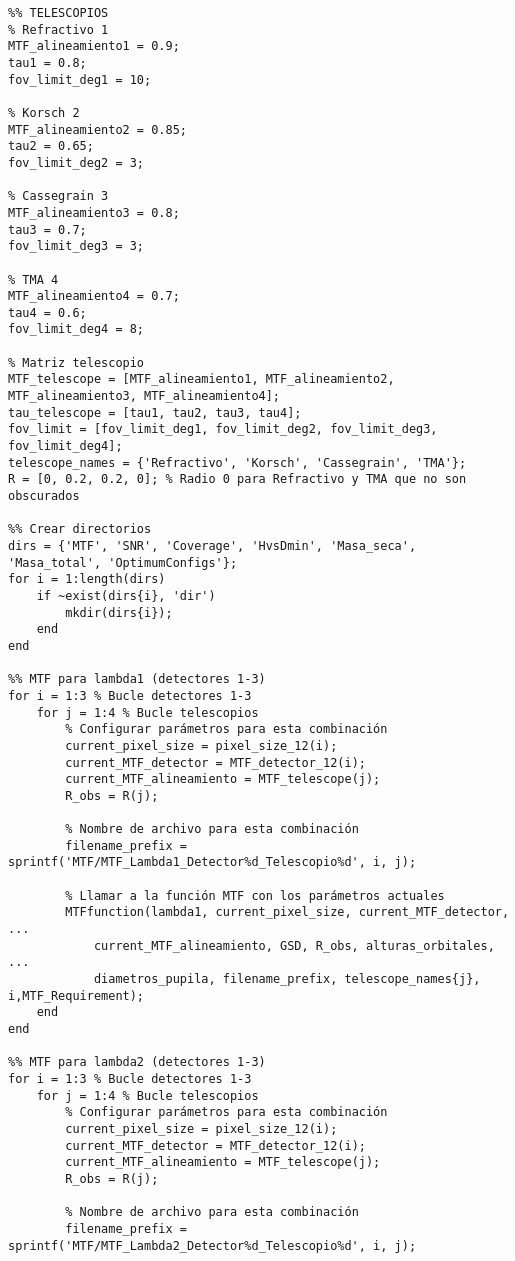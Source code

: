 \begin{verbatim}
%% TELESCOPIOS
% Refractivo 1
MTF_alineamiento1 = 0.9;
tau1 = 0.8;
fov_limit_deg1 = 10;

% Korsch 2
MTF_alineamiento2 = 0.85;
tau2 = 0.65;
fov_limit_deg2 = 3;

% Cassegrain 3
MTF_alineamiento3 = 0.8;
tau3 = 0.7;
fov_limit_deg3 = 3;

% TMA 4
MTF_alineamiento4 = 0.7;
tau4 = 0.6;
fov_limit_deg4 = 8;

% Matriz telescopio
MTF_telescope = [MTF_alineamiento1, MTF_alineamiento2, MTF_alineamiento3, MTF_alineamiento4];
tau_telescope = [tau1, tau2, tau3, tau4];
fov_limit = [fov_limit_deg1, fov_limit_deg2, fov_limit_deg3, fov_limit_deg4];
telescope_names = {'Refractivo', 'Korsch', 'Cassegrain', 'TMA'};
R = [0, 0.2, 0.2, 0]; % Radio 0 para Refractivo y TMA que no son obscurados

%% Crear directorios
dirs = {'MTF', 'SNR', 'Coverage', 'HvsDmin', 'Masa_seca', 'Masa_total', 'OptimumConfigs'};
for i = 1:length(dirs)
    if ~exist(dirs{i}, 'dir')
        mkdir(dirs{i});
    end
end

%% MTF para lambda1 (detectores 1-3)
for i = 1:3 % Bucle detectores 1-3
    for j = 1:4 % Bucle telescopios
        % Configurar parámetros para esta combinación
        current_pixel_size = pixel_size_12(i);
        current_MTF_detector = MTF_detector_12(i);
        current_MTF_alineamiento = MTF_telescope(j);
        R_obs = R(j);
        
        % Nombre de archivo para esta combinación
        filename_prefix = sprintf('MTF/MTF_Lambda1_Detector%d_Telescopio%d', i, j);
        
        % Llamar a la función MTF con los parámetros actuales
        MTFfunction(lambda1, current_pixel_size, current_MTF_detector, ...
            current_MTF_alineamiento, GSD, R_obs, alturas_orbitales, ...
            diametros_pupila, filename_prefix, telescope_names{j}, i,MTF_Requirement);
    end
end

%% MTF para lambda2 (detectores 1-3)
for i = 1:3 % Bucle detectores 1-3
    for j = 1:4 % Bucle telescopios
        % Configurar parámetros para esta combinación
        current_pixel_size = pixel_size_12(i);
        current_MTF_detector = MTF_detector_12(i);
        current_MTF_alineamiento = MTF_telescope(j);
        R_obs = R(j);
        
        % Nombre de archivo para esta combinación
        filename_prefix = sprintf('MTF/MTF_Lambda2_Detector%d_Telescopio%d', i, j);
        

\end{verbatim}
